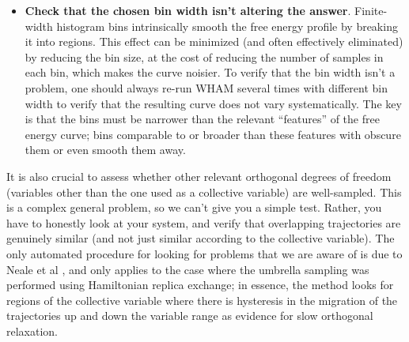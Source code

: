 \begin{itemize}
    \item \textbf{Check that the chosen bin width isn't altering the answer}.
    Finite-width histogram bins intrinsically smooth the free energy profile by
    breaking it into regions.  This effect can be minimized (and often
    effectively eliminated) by reducing the bin size, at the cost of reducing
    the number of samples in each bin, which makes the curve noisier.  To verify
    that the bin width isn't a problem, one should always re-run WHAM several
    times with different bin width to verify that the resulting curve does not
    vary systematically.  The key is that the bins must be narrower than the
    relevant ``features'' of the free energy curve; bins comparable to or
    broader than these features with obscure them or even smooth them away.

\end{itemize}

It is also crucial to assess whether other relevant orthogonal degrees of
freedom (variables other than the one used as a collective variable) are
well-sampled.  This is a complex general problem, so we can't give you a simple
test.  Rather, you have to honestly look at your system, and verify that
overlapping trajectories are genuinely similar (and not just similar according
to the collective variable).  The only automated procedure for looking for
problems that we are aware of is due to Neale et al \cite{ADD REF}, and only
applies to the case where the umbrella sampling was performed using Hamiltonian
replica exchange; in essence, the method looks for regions of the collective
variable where there is hysteresis in the migration of the trajectories up and
down the variable range as evidence for slow orthogonal relaxation.
